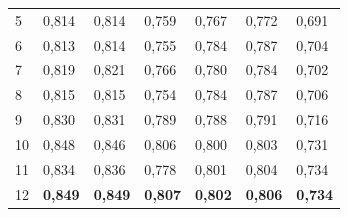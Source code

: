 \begin{table}[]
\begin{tabular}{l|l|l|l|l|l|l}
		5 &          0,814 &       0,814 &       0,759 &                     0,767 &                  0,772 &                  0,691 \\
		6 &          0,813 &       0,814 &       0,755 &                     0,784 &                  0,787 &                  0,704 \\
		7 &          0,819 &       0,821 &       0,766 &                     0,780 &                  0,784 &                  0,702 \\
		8 &          0,815 &       0,815 &       0,754 &                     0,784 &                  0,787 &                  0,706 \\
		9 &          0,830 &       0,831 &       0,789 &                     0,788 &                  0,791 &                  0,716 \\
		10 &          0,848 &       0,846 &       0,806 &                     0,800 &                  0,803 &                  0,731 \\
		11 &          0,834 &       0,836 &       0,778 &                     0,801 &                  0,804 &                  0,734 \\
		12 &          \textbf{0,849} &       \textbf{0,849} &       \textbf{0,807} &                     \textbf{0,802} &                  \textbf{0,806} &                  \textbf{0,734} \\
	\end{tabular}
	\label{tbl:3rd_sample_f1}
\end{table}

